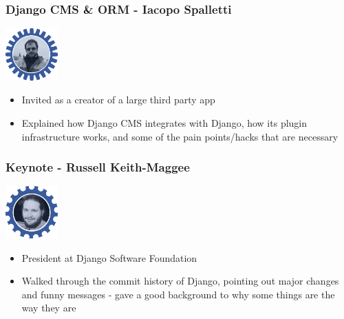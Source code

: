 \documentclass{beamer}
\begin{document}
\begin{frame}[fragile]\frametitle{Django CMS & ORM - Iacopo Spalletti}

    \begin{center}
        \includegraphics[width=2cm]{speaker-iacopo}
    \end{center}

    \begin{itemize}
        \item Invited as a creator of a large third party app
        \item Explained how Django CMS integrates with Django, how its plugin infrastructure works, and some of the pain points/hacks that are necessary
    \end{itemize}

\end{frame}


\begin{frame}[fragile]\frametitle{Keynote - Russell Keith-Maggee}

    \begin{center}
        \includegraphics[width=2cm]{speaker-russ}
    \end{center}

    \begin{itemize}
        \item President at Django Software Foundation
        \item Walked through the commit history of Django, pointing out major changes and funny messages - gave a good background to why some things are the way they are
    \end{itemize}

\end{frame}
\end{document}
